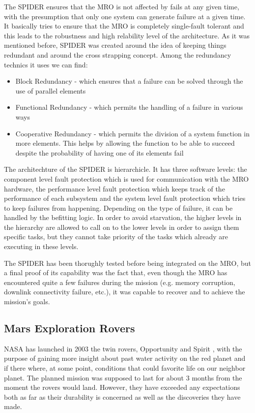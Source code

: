 The SPIDER ensures that the MRO is not affected by fails at any given time, with
the presumption that only one system can generate failure at a given time. It
basically tries to ensure that the MRO is completely single-fault tolerant and
this leads to the robustness and high relability level of the architecture. As
it was mentioned before, SPIDER was created around the idea of keeping things
redundant and around the cross strapping concept. Among the redundancy technics
it uses we can find:
\begin{itemize}
\item Block Redundancy - which ensures that a failure can be solved through the
use of parallel elements
\item Functional Redundancy - which permits the handling of a failure in various
ways
\item Cooperative Redundancy - which permits the division of a system function
in more elements. This helps by allowing the function to be able to succeed despite
the probability of having one of its elements fail
\end{itemize}

The architechture of the SPIDER is hierarchicle. It has three software levels:
the component level fault protection which is used for communication with the
MRO hardware, the performance level fault protection which keeps track of the
performance of each subsystem and the system level fault protection which tries
to keep failures from happening. Depending on the type of failure, it can be
handled by the befitting logic. In order to avoid starvation, the higher levels
in the hierarchy are allowed to call on to the lower levels in order to assign
them specific tasks, but they cannot take priority of the tasks which
already are executing in these levels.

The SPIDER has been thorughly tested before being integrated on the MRO, but a
final proof of its capability was the fact that, even though the MRO has
encountered quite a few failures during the mission (e.g. memory corruption,
downlink connectivity failure, etc.), it was capable to recover and to achieve
the mission's goals.

\subsection{Mars Exploration Rovers}

NASA has launched in 2003 the twin rovers, Opportunity and Spirit
\cite{mer-nasa}, with the purpose of gaining more insight about past water
activity on the red planet and if there where, at some point, conditions that
could favorite life on our neighbor planet. The planned mission was supposed to
last for about 3 months from the moment the rovers would land. However, they
have exceeded any expectations both as far as their durability is concerned as
well as the discoveries they have made.

